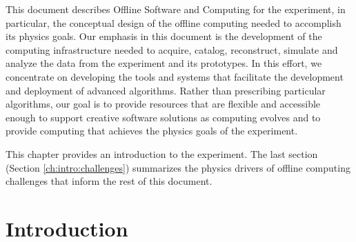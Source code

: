 \documentclass[../main-v1.tex]{subfiles}
\begin{document}
This document describes Offline Software and Computing for the  experiment, in particular, the conceptual design of the offline computing needed to accomplish its physics goals. Our emphasis in this document is the development of the computing infrastructure needed to acquire, catalog, reconstruct, simulate and analyze the data from the  experiment and its prototypes. In this effort, we concentrate on developing the tools and systems that facilitate the development and deployment of advanced algorithms. %
Rather than prescribing particular algorithms, our goal is to provide resources that are flexible and accessible enough to support creative software solutions as  computing evolves
and to provide computing that achieves the physics goals of the  experiment.

This chapter provides an introduction to the  experiment.  The last section (Section \ref{ch:intro:challenges}) summarizes the physics drivers of offline computing challenges that inform the rest of this document.


\section{Introduction }\label{sec:intro-introduction}
\end{document}
